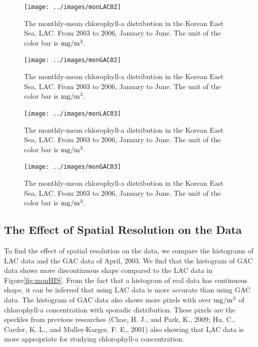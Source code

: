\begin{figure}[p]
	\centering
	\texttt{[image: ../images/monLAC02]}\\
	\caption{The monthly-mean chlorophyll-a distribution in the Korean East Sea, LAC. From 2003 to 2006, January to June. The unit of the color bar is $\rm mg/m^3$.}
	\label{fig:monLAC02}
\end{figure}

\begin{figure}[p]
	\centering
	\texttt{[image: ../images/monGAC02]}\\
	\caption{The monthly-mean chlorophyll-a distribution in the Korean East Sea, LAC. From 2003 to 2006, January to June. The unit of the color bar is $\rm mg/m^3$.}
	\label{fig:monGAC02}
\end{figure}

\begin{figure}[p]
	\centering
	\texttt{[image: ../images/monLAC03]}\\
	\caption{The monthly-mean chlorophyll-a distribution in the Korean East Sea, LAC. From 2003 to 2006, January to June. The unit of the color bar is $\rm mg/m^3$.}
	\label{fig:monLAC03}
\end{figure}

\begin{figure}[p]
	\centering
	\texttt{[image: ../images/monGAC03]}\\
	\caption{The monthly-mean chlorophyll-a distribution in the Korean East Sea, LAC. From 2003 to 2006, January to June. The unit of the color bar is $\rm mg/m^3$.}
	\label{fig:monGAC03}
\end{figure}


\newpage
\subsection{The Effect of Spatial Resolution on the Data}
 
To find the effect of spatial resolution on the data, we compare the histograms of LAC data and the GAC data of April, 2003. We find that the histogram of GAC data shows more discontinuous shape compared to the LAC data in Figure\ref{fig:monHIS}. From the fact that a histogram of real data has continuous shape, it can be inferred that using LAC data is more accurate than using GAC data. The histogram of GAC data also shows more pixels with over $\rm mg/m^3$ of chlorophyll-a concentration with sporadic distribution. These pixels are the speckles from previous researches (Chae, H. J., and Park, K., 2009; Hu, C., Carder, K. L., and Muller-Karger, F. E., 2001) also showing that LAC data is more appropriate for studying chlorophyll-a concentration.
  
